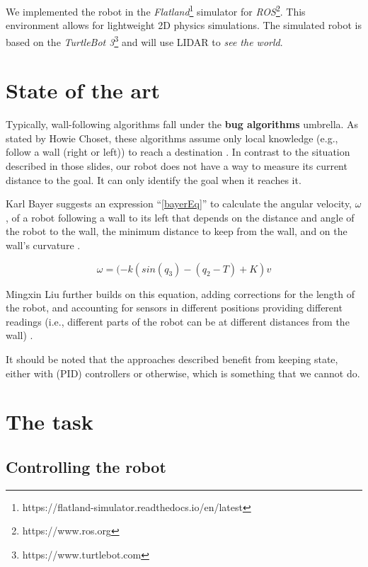 \documentclass[conference]{IEEEtran}
\begin{document}
We implemented the robot in the \emph{Flatland}\footnote{https://flatland-simulator.readthedocs.io/en/latest} simulator for \emph{ROS}\footnote{https://www.ros.org}. This environment allows for lightweight 2D physics simulations. The simulated robot is based on the \emph{TurtleBot 3}\footnote{https://www.turtlebot.com} and will use LIDAR to \textit{see the world}.

\section{State of the art}

Typically, wall-following algorithms fall under the \textbf{bug algorithms} umbrella. As stated by Howie Choset, these algorithms assume only local knowledge (e.g., follow a wall (right or left)) to reach a destination \cite{choset_robotic_nodate}. In contrast to the situation described in those slides, our robot does not have a way to measure its current distance to the goal. It can only identify the goal when it reaches it.

Karl Bayer suggests an expression ``\eqref{bayerEq}'' to calculate the angular velocity, $\omega$, of a robot following a wall to its left that depends on the distance and angle of the robot to the wall, the minimum distance to keep from the wall, and on the wall's curvature \cite{bayer_wall_nodate}.

\begin{equation}
\omega = (-k(sin(q_3) - (q_2 - T) + K) v \label{bayerEq}
\end{equation}

Mingxin Liu further builds on this equation, adding corrections for the length of the robot, and accounting for sensors in different positions providing different readings (i.e., different parts of the robot can be at different distances from the wall) \cite{liu_comparison_2020}.

It should be noted that the approaches described benefit from keeping state, either with (PID) controllers or otherwise, which is something that we cannot do.

\section{The task}

\subsection{Controlling the robot}
\end{document}
